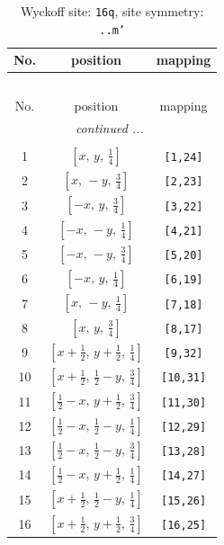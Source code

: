 \documentclass[fleqn,8pt]{jsarticle}
\begin{document}
\renewcommand{\arraystretch}{1.2}
\begin{longtable}{ccc}
\caption{Wyckoff site: {\tt 16q}, site symmetry: {\tt ..m'}}
 \\
 \hline \hline
No. & position & mapping \\ \hline \endfirsthead

\multicolumn{2}{l}{\tablename\ \thetable{}} \\
 \hline \hline
No. & position & mapping \\ \hline \endhead

 \hline \hline
\multicolumn{2}{r}{\footnotesize\it continued ...} \\ \endfoot

 \hline \hline
\multicolumn{2}{r}{} \\ \endlastfoot

1 & $\left[ x,\, y,\, \frac{1}{4} \right]$ & {\tt [1,24]} \\ \hline
2 & $\left[ x,\, - y,\, \frac{3}{4} \right]$ & {\tt [2,23]} \\ \hline
3 & $\left[ - x,\, y,\, \frac{3}{4} \right]$ & {\tt [3,22]} \\ \hline
4 & $\left[ - x,\, - y,\, \frac{1}{4} \right]$ & {\tt [4,21]} \\ \hline
5 & $\left[ - x,\, - y,\, \frac{3}{4} \right]$ & {\tt [5,20]} \\ \hline
6 & $\left[ - x,\, y,\, \frac{1}{4} \right]$ & {\tt [6,19]} \\ \hline
7 & $\left[ x,\, - y,\, \frac{1}{4} \right]$ & {\tt [7,18]} \\ \hline
8 & $\left[ x,\, y,\, \frac{3}{4} \right]$ & {\tt [8,17]} \\ \hline
9 & $\left[ x + \frac{1}{2},\, y + \frac{1}{2},\, \frac{1}{4} \right]$ & {\tt [9,32]} \\ \hline
10 & $\left[ x + \frac{1}{2},\, \frac{1}{2} - y,\, \frac{3}{4} \right]$ & {\tt [10,31]} \\ \hline
11 & $\left[ \frac{1}{2} - x,\, y + \frac{1}{2},\, \frac{3}{4} \right]$ & {\tt [11,30]} \\ \hline
12 & $\left[ \frac{1}{2} - x,\, \frac{1}{2} - y,\, \frac{1}{4} \right]$ & {\tt [12,29]} \\ \hline
13 & $\left[ \frac{1}{2} - x,\, \frac{1}{2} - y,\, \frac{3}{4} \right]$ & {\tt [13,28]} \\ \hline
14 & $\left[ \frac{1}{2} - x,\, y + \frac{1}{2},\, \frac{1}{4} \right]$ & {\tt [14,27]} \\ \hline
15 & $\left[ x + \frac{1}{2},\, \frac{1}{2} - y,\, \frac{1}{4} \right]$ & {\tt [15,26]} \\ \hline
16 & $\left[ x + \frac{1}{2},\, y + \frac{1}{2},\, \frac{3}{4} \right]$ & {\tt [16,25]} \\
\end{longtable}
\end{document}
